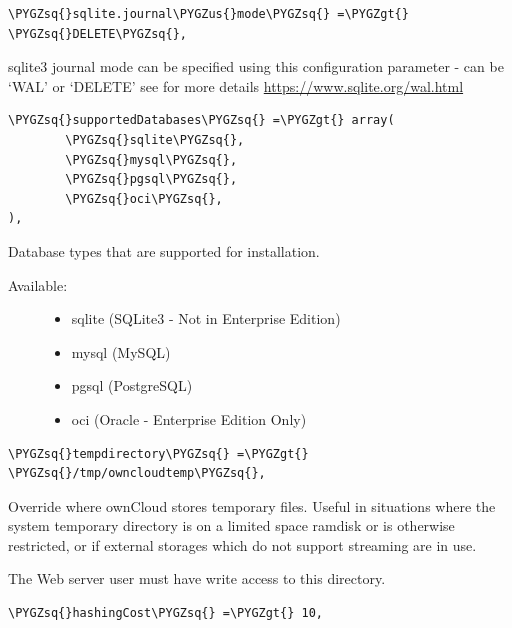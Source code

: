 \documentclass[letterpaper,10pt,english]{sphinxmanual}
\def\PYGZus{\char`\_}
\def\PYGZgt{\char`\>}
\def\PYGZsq{\char`\'}
\renewcommand\PYGZsq{\textquotesingle}
\begin{document}
\begin{Verbatim}[commandchars=\\\{\}]
\PYGZsq{}sqlite.journal\PYGZus{}mode\PYGZsq{} =\PYGZgt{} \PYGZsq{}DELETE\PYGZsq{},
\end{Verbatim}

sqlite3 journal mode can be specified using this configuration parameter -
can be `WAL' or `DELETE' see for more details \href{https://www.sqlite.org/wal.html}{https://www.sqlite.org/wal.html}

\begin{Verbatim}[commandchars=\\\{\}]
\PYGZsq{}supportedDatabases\PYGZsq{} =\PYGZgt{} array(
        \PYGZsq{}sqlite\PYGZsq{},
        \PYGZsq{}mysql\PYGZsq{},
        \PYGZsq{}pgsql\PYGZsq{},
        \PYGZsq{}oci\PYGZsq{},
),
\end{Verbatim}

Database types that are supported for installation.
\begin{description}
\item[{Available:}] \leavevmode\begin{itemize}
\item {} 
sqlite (SQLite3 - Not in Enterprise Edition)

\item {} 
mysql (MySQL)

\item {} 
pgsql (PostgreSQL)

\item {} 
oci (Oracle - Enterprise Edition Only)

\end{itemize}

\end{description}

\begin{Verbatim}[commandchars=\\\{\}]
\PYGZsq{}tempdirectory\PYGZsq{} =\PYGZgt{} \PYGZsq{}/tmp/owncloudtemp\PYGZsq{},
\end{Verbatim}

Override where ownCloud stores temporary files. Useful in situations where
the system temporary directory is on a limited space ramdisk or is otherwise
restricted, or if external storages which do not support streaming are in
use.

The Web server user must have write access to this directory.

\begin{Verbatim}[commandchars=\\\{\}]
\PYGZsq{}hashingCost\PYGZsq{} =\PYGZgt{} 10,
\end{Verbatim}
\end{document}
